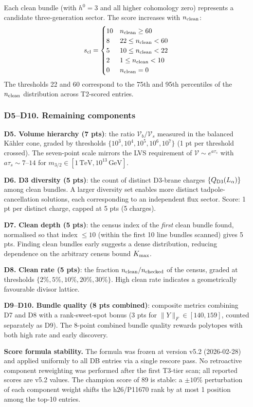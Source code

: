 \documentclass[11pt,a4paper]{article}
\begin{document}
Each clean bundle (with $h^0=3$ and all higher cohomology zero)
represents a candidate three-generation sector.
The score increases with $n_{\rm clean}$:
\[
  s_{\rm cl} = \begin{cases}
    10 & n_{\rm clean} \geq 60 \\
    8  & 22 \leq n_{\rm clean} < 60 \\
    5  & 10 \leq n_{\rm clean} < 22 \\
    2  & 1  \leq n_{\rm clean} < 10 \\
    0  & n_{\rm clean} = 0
  \end{cases}
\]
The thresholds 22 and 60 correspond to the 75th and 95th percentiles
of the $n_{\rm clean}$ distribution across T2-scored entries.

\subsubsection*{D5--D10. Remaining components}

\textbf{D5. Volume hierarchy (7 pts)}: the ratio
$\mathcal{V}_b / \mathcal{V}_s$ measured in the balanced K\"{a}hler
cone, graded by thresholds $\{10^3, 10^4, 10^5, 10^6, 10^7\}$
(1 pt per threshold crossed).
The seven-point scale mirrors the LVS requirement of
$\mathcal{V} \sim e^{a\tau_s}$ with $a\tau_s \sim 7$--$14$ for
$m_{3/2} \in [1\,\text{TeV}, 10^{13}\,\text{GeV}]$.

\textbf{D6. D3 diversity (5 pts)}: the count of distinct D3-brane
charges $\{Q_{\rm D3}(L_\alpha)\}$ among clean bundles.
A larger diversity set enables more distinct tadpole-cancellation
solutions, each corresponding to an independent flux sector.
Score: 1 pt per distinct charge, capped at 5 pts (5 charges).

\textbf{D7. Clean depth (5 pts)}: the census index of the
\emph{first} clean bundle found, normalised so that index $\leq 10$
(within the first 10 line bundles scanned) gives 5 pts.
Finding clean bundles early suggests a dense distribution,
reducing dependence on the arbitrary census bound $K_{\rm max}$.

\textbf{D8. Clean rate (5 pts)}: the fraction
$n_{\rm clean}/n_{\rm checked}$ of the census,
graded at thresholds $\{2\%, 5\%, 10\%, 20\%, 30\%\}$.
High clean rate indicates a geometrically favourable divisor lattice.

\textbf{D9--D10. Bundle quality (8 pts combined)}: composite
metrics combining D7 and D8 with a rank-sweet-spot bonus
(3 pts for $\|Y\|_F \in [140, 159]$, counted separately as D9).
The 8-point combined bundle quality rewards polytopes with both
high rate and early discovery.

\vspace{4pt}
\noindent\textbf{Score formula stability.}
The formula was frozen at version v5.2 (2026-02-28) and applied
uniformly to all DB entries via a single rescore pass.
No retroactive component reweighting was performed after the first
T3-tier scan; all reported scores are v5.2 values.
The champion score of 89 is stable: a $\pm 10\%$ perturbation of
each component weight shifts the h26/P11670 rank by at most 1 position
among the top-10 entries.



\end{document}
